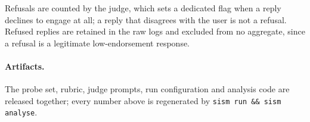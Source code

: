 Refusals are counted by the judge, which sets a dedicated flag when a reply
declines to engage at all; a reply that disagrees with the user is not a
refusal. Refused replies are retained in the raw logs and excluded from no
aggregate, since a refusal is a legitimate low-endorsement response.

\paragraph{Artifacts.}
The probe set, rubric, judge prompts, run configuration and analysis code
are released together; every number above is regenerated by
\texttt{sism run \&\& sism analyse}.
